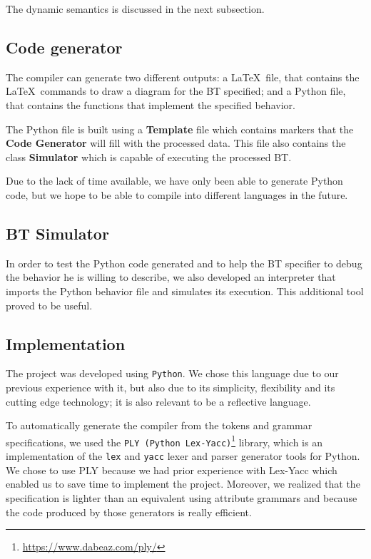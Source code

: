 \documentclass[a4paper,UKenglish,cleveref, autoref, thm-restate]{oasics-v2019}
\begin{document}
The dynamic semantics is discussed in the next subsection.

\subsection{Code generator}
The compiler can generate two different outputs:
a \LaTeX\ file, that contains the \LaTeX\ commands to draw a diagram for the BT specified;
and a Python file, that contains the functions that implement the specified behavior.


The Python file is built using a \textbf{Template} file which contains markers that the \textbf{Code Generator} 
will fill with the processed data.
This file also contains the class \textbf{Simulator} which is capable of executing the processed BT.

Due to the lack of time available, we have only been able to generate Python code, 
but we hope to be able to compile into different languages in the future.



\subsection{BT Simulator}
In order to test the Python code generated and to help the BT specifier to debug the behavior he is willing
to describe, we also developed an interpreter that imports the Python behavior file and simulates its
execution.
This additional tool proved to be useful.

\subsection{Implementation}


The project was developed using \texttt{Python}.
We chose this language due to our previous experience with it, but also due to its simplicity, 
flexibility and its cutting edge technology; it is also relevant to be a reflective language.

To automatically generate the compiler from the tokens and grammar specifications,
we used the \texttt{PLY (Python Lex-Yacc)}\footnote{\url{https://www.dabeaz.com/ply/}} library, which is an implementation of the \texttt{lex} and \texttt{yacc} lexer and parser generator tools for Python.
We chose to use PLY because we had prior experience with Lex-Yacc which enabled us to save time to implement the project.
Moreover, we realized that the specification is lighter than an equivalent using attribute grammars and because the code produced by those generators is really efficient.
\end{document}
